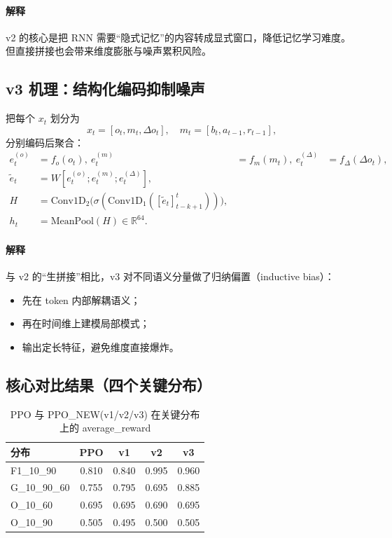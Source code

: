 ﻿\documentclass[11pt,a4paper]{ctexart}
\begin{document}
\paragraph{解释}
v2 的核心是把 RNN 需要“隐式记忆”的内容转成显式窗口，降低记忆学习难度。但直接拼接也会带来维度膨胀与噪声累积风险。

\subsection{v3 机理：结构化编码抑制噪声}
把每个 $x_t$ 划分为
\begin{equation}
x_t=[o_t, m_t, \Delta o_t],\quad m_t=[b_t,a_{t-1},r_{t-1}],
\end{equation}
分别编码后聚合：
\begin{align}
e_t^{(o)}&=f_o(o_t),\
e_t^{(m)}&=f_m(m_t),\
e_t^{(\Delta)}&=f_{\Delta}(\Delta o_t),\\
\tilde e_t&=W[e_t^{(o)};e_t^{(m)};e_t^{(\Delta)}],\\
H&=\mathrm{Conv1D}_2\big(\sigma(\mathrm{Conv1D}_1([\tilde e_t]_{t-k+1}^{t}))\big),\\
h_t&=\mathrm{MeanPool}(H)\in\mathbb{R}^{64}.
\end{align}

\paragraph{解释}
与 v2 的“生拼接”相比，v3 对不同语义分量做了归纳偏置（inductive bias）：
\begin{itemize}
  \item 先在 token 内部解耦语义；
  \item 再在时间维上建模局部模式；
  \item 输出定长特征，避免维度直接爆炸。
\end{itemize}

\subsection{核心对比结果（四个关键分布）}
\begin{table}[H]
\centering
\caption{PPO 与 PPO\_NEW(v1/v2/v3) 在关键分布上的 average\_reward}
\begin{tabular}{lcccc}
\toprule
分布 & PPO & v1 & v2 & v3 \\
\midrule
F1\_10\_90 & 0.810 & 0.840 & 0.995 & 0.960 \\
G\_10\_90\_60 & 0.755 & 0.795 & 0.695 & 0.885 \\
O\_10\_60 & 0.695 & 0.695 & 0.690 & 0.695 \\
O\_10\_90 & 0.505 & 0.495 & 0.500 & 0.505 \\
\bottomrule
\end{tabular}
\end{table}
\end{document}

